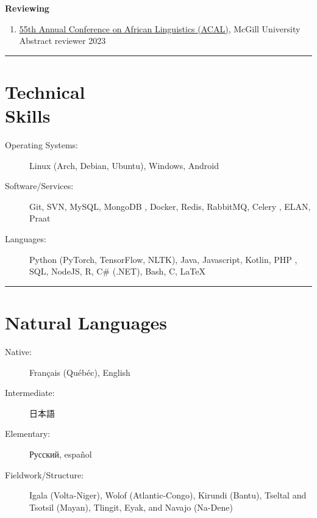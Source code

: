 \documentclass[margin,line]{resume}
\begin{document}
\begin{resume}
	\textbf{Reviewing}
	\begin{enumerate}[-, leftmargin=1em, topsep=4pt]
		\item[]  \href{https://acal55.mull-lab.org/}{55th Annual Conference on African Linguistics (ACAL)}, McGill University\\
		      \hphantom{...}Abstract reviewer \hfill 2023
	\end{enumerate}

	\vspace{-0.9em}\rule{\textwidth}{0.4pt}


	\section{\mysidestyle Technical\\Skills}\vspace{2mm}
	\begin{description}
		\item[Operating Systems:] Linux (Arch, Debian, Ubuntu), Windows, Android
		\item[Software/Services:] Git, SVN, MySQL, MongoDB%
		      , Docker, Redis, RabbitMQ, Celery%
		      , ELAN, Praat%
		\item[Languages:] Python (PyTorch, TensorFlow, NLTK),
		      Java, Javascript, Kotlin, PHP%
		      , SQL, NodeJS, R, C\# (.NET),
		      Bash, C, \LaTeX
	\end{description}

	\vspace{-1.1em}\rule{\textwidth}{0.4pt}

	\newpage


	\section{\mysidestyle Natural Languages}\vspace{2mm}
	\begin{description}
		\item[Native:] Français (Québéc), English
		\item[Intermediate:] \begin{CJK}{UTF8}{min}日本語\end{CJK}
		\item[Elementary:] Русский, español
		\item[Fieldwork/Structure:] Igala (Volta-Niger), Wolof (Atlantic-Congo), Kirundi (Bantu),
		      Tseltal and Tsotsil (Mayan), Tlingit, Eyak, and Navajo (Na-Dene)%
	\end{description}

	\BgThispage

\end{resume}
\end{document}
